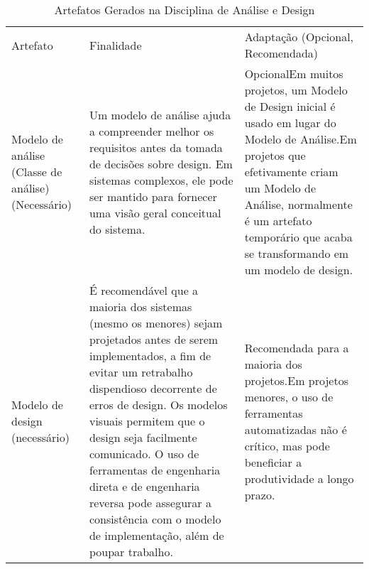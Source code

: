 \begin{table}[]
\centering
\caption{Artefatos Gerados na Disciplina de Análise e Design}
\label{my-label}
\begin{tabular}{lll}
Artefato                                           & Finalidade                                                                                                                                                                                                                                                                                                                                                                                                        & Adaptação (Opcional, Recomendada)                                                                                                                                                                                                                                                                                                                                                \\
Modelo de análise (Classe de análise) (Necessário) & Um modelo de análise ajuda a compreender melhor os requisitos antes da tomada de decisões sobre design. Em sistemas complexos, ele pode ser mantido para fornecer uma visão geral conceitual do sistema.                                                                                                                                                                                                          & OpcionalEm muitos projetos, um Modelo de Design inicial é usado em lugar do Modelo de Análise.Em projetos que efetivamente criam um Modelo de Análise, normalmente é um artefato temporário que acaba se transformando em um modelo de design.                                                                                                                                   \\
Modelo de design (necessário)                      & É recomendável que a maioria dos sistemas (mesmo os menores) sejam projetados antes de serem implementados, a fim de evitar um retrabalho dispendioso decorrente de erros de design. Os modelos visuais permitem que o design seja facilmente comunicado. O uso de ferramentas de engenharia direta e de engenharia reversa pode assegurar a consistência com o modelo de implementação, além de poupar trabalho. & Recomendada para a maioria dos projetos.Em projetos menores, o uso de ferramentas automatizadas não é crítico, mas pode beneficiar a produtividade a longo prazo.                                                                                                                                                                                                                \\

\end{tabular}
\end{table}
